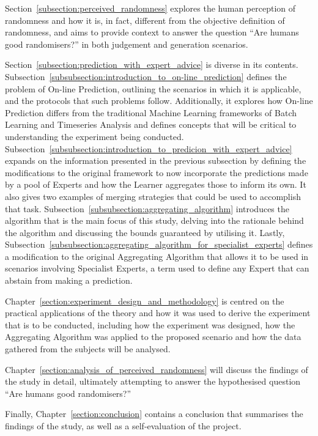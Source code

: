 Section~\ref{subsection:perceived_randomness} explores the human perception of randomness and how it is, in fact, different from the objective definition of randomness, and aims to provide context to answer the question ``Are humans good randomisers?'' in both judgement and generation scenarios.

Section~\ref{subsection:prediction_with_expert_advice} is diverse in its contents. Subsection~\ref{subsubsection:introduction_to_on-line_prediction} defines the problem of On-line Prediction, outlining the scenarios in which it is applicable, and the protocols that such problems follow. Additionally, it explores how On-line Prediction differs from the traditional Machine Learning frameworks of Batch Learning and Timeseries Analysis and defines concepts that will be critical to understanding the experiment being conducted. Subsection~\ref{subsubsection:introduction_to_predicion_with_expert_advice} expands on the information presented in the previous subsection by defining the modifications to the original framework to now incorporate the predictions made by a pool of Experts and how the Learner aggregates those to inform its own. It also gives two examples of merging strategies that could be used to accomplish that task. Subsection~\ref{subsubsection:aggregating_algorithm} introduces the algorithm that is the main focus of this study, delving into the rationale behind the algorithm and discussing the bounds guaranteed by utilising it. Lastly, Subsection~\ref{subsubsection:aggregating_algorithm_for_specialist_experts} defines a modification to the original Aggregating Algorithm that allows it to be used in scenarios involving Specialist Experts, a term used to define any Expert that can abstain from making a prediction.

Chapter~\ref{section:experiment_design_and_methodology} is centred on the practical applications of the theory and how it was used to derive the experiment that is to be conducted, including how the experiment was designed, how the Aggregating Algorithm was applied to the proposed scenario and how the data gathered from the subjects will be analysed.

Chapter~\ref{section:analysis_of_perceived_randomness} will discuss the findings of the study in detail, ultimately attempting to answer the hypothesised  question ``Are humans good randomisers?''

Finally, Chapter~\ref{section:conclusion} contains a conclusion that summarises the findings of the study, as well as a self-evaluation of the project.
